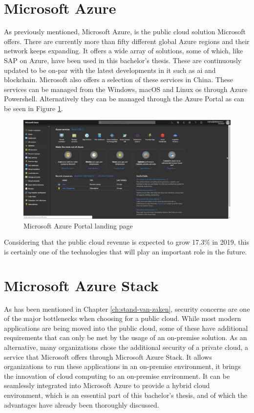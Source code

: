 \section{Microsoft Azure}
As previously mentioned, Microsoft Azure, is the public cloud solution Microsoft offers. 
There are currently more than fifty different global Azure regions and their network keeps expanding. 
It offers a wide array of solutions, some of which, like SAP on Azure, have been used in this bachelor's thesis. 
These are continuously updated to be on-par with the latest developments in \acrshort{it} such as \acrfull{ai} and blockchain. 
Microsoft also offers a selection of these services in China. 
These services can be managed from the Windows, macOS  and Linux \acrshort{os} through Azure Powershell. 
Alternatively they can be managed through the Azure Portal as can be seen in Figure \ref{fig:Azure_Portal}.

\begin{figure}[h]
	\captionsetup{width=0.8\linewidth}
	\includegraphics[width=0.9\linewidth]{img/Toekomstvisie/Azure0.png}
	\centering
	\caption[Azure Portal]{Microsoft Azure Portal landing page}
	\label{fig:Azure_Portal}
\end{figure}
Considering that the public cloud revenue is expected to grow 17.3\% in 2019, this is certainly one of the technologies that will play an important role in the future. \autocite{Ng2018}

\section{Microsoft Azure Stack}
As has been mentioned in Chapter \ref{ch:stand-van-zaken}, security concerns are one of the major bottlenecks when choosing for a public cloud. 
While most modern applications are being moved into the public cloud, some of these have additional requirements that can only be met by the usage of an on-premise solution. 
As an alternative, many organizations chose the additional security of a private cloud, a service that Microsoft offers through Microsoft Azure Stack. 
It allows organizations to run these applications in an on-premise environment, it brings the innovation of cloud computing to an on-premise environment.
It can be seamlessly integrated into Microsoft Azure to provide a hybrid cloud environment, which is an essential part of this bachelor's thesis, and of which the advantages have already been thoroughly discussed.

